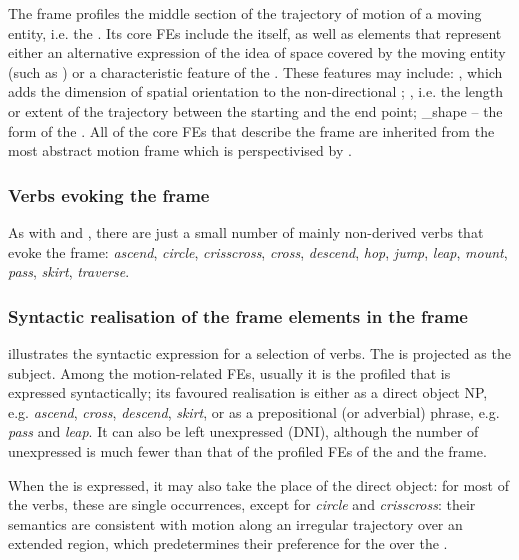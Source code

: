 \documentclass[output=paper,colorlinks,citecolor=brown]{langscibook}
\begin{document}
The frame profiles the middle section of the trajectory of motion of a moving entity, i.e. the . Its core FEs include the  itself, as well as  elements that represent either an alternative expression of the idea of space covered by the moving entity (such as ) or a characteristic feature of the . These features may include: , which adds the dimension of spatial orientation to the non-directional ; , i.e. the length or extent of the trajectory between the starting and the end point; \_shape -- the form of the . All of the core FEs that describe the  frame are inherited from the most abstract motion frame  which is perspectivised by . 

\subsubsection{Verbs evoking the  frame}

As with  and , there are just a small number of mainly non-derived verbs that evoke the frame: \textit{ascend}, \textit{circle}, \textit{crisscross}, \textit{cross}, \textit{descend}, \textit{hop}, \textit{jump}, \textit{leap}, \textit{mount}, \textit{pass}, \textit{skirt}, \textit{traverse}.


\subsubsection{Syntactic realisation of the frame elements in the  frame}

 illustrates the syntactic expression for a selection of  verbs.  The  is projected as the subject. Among the motion-related FEs, usually it is the profiled  that is expressed syntactically; its favoured realisation is either as a direct object NP, e.g. \textit{ascend}, \textit{cross}, \textit{descend}, \textit{skirt}, or as a prepositional (or adverbial) phrase, e.g. \textit{pass} and \textit{leap}. It can also be left unexpressed (DNI), although the number of unexpressed  is much fewer than that of the profiled FEs of the  and the  frame.

When the  is expressed, it may also take the place of the direct object: for most of the verbs, these are single occurrences, except for \textit{circle} and \textit{crisscross}: their semantics are consistent with motion along an irregular trajectory over an extended region, which predetermines their preference for the  over the .  
\end{document}
